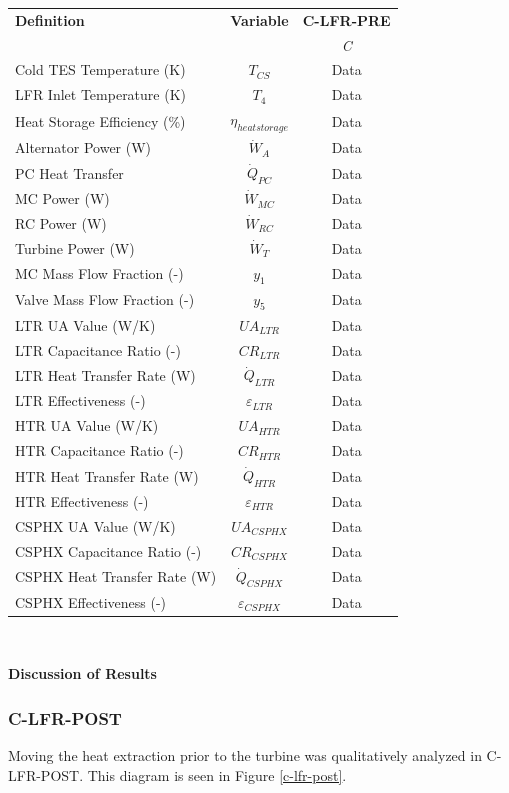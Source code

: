 \begin{paracol}{2}
\begin{specialtable}[H]
    \caption{Calculated system parameters for salt charging C-LFR-PRE cycle configuration with TES cold storage set to 663.2 K.\label{tab-c-lfr-pre}}
    \begin{tabular}{lcc}
    \toprule
    \textbf{Definition} & \textbf{Variable} & \textbf{C-LFR-PRE}\\
    & & \textit{C}\\
    \midrule	
    Cold TES Temperature (K)	&	$T_{CS}$	&	Data	\\
    LFR Inlet Temperature (K)	&	$T_{4}$	&	Data	\\
    Heat Storage Efficiency (\%)	&	$\eta_{heatstorage}$	&	Data	\\
    Alternator Power (W)	&	$\dot{W}_{A}$	&	Data	\\
    PC Heat Transfer	&	$\dot{Q}_{PC}$	&	Data	\\
    MC Power (W)	&	$\dot{W}_{MC}$	&	Data	\\
    RC Power (W)	&	$\dot{W}_{RC}$	&	Data	\\
    Turbine Power (W)	&	$\dot{W}_{T}$	&	Data	\\
    MC Mass Flow Fraction (-)	&	$y_{1}$	&	Data	\\
    Valve Mass Flow Fraction (-)	&	$y_{5}$	&	Data	\\
    LTR UA Value (W/K)	&	$UA_{LTR}$	&	Data	\\
    LTR Capacitance Ratio (-)	&	$CR_{LTR}$	&	Data	\\
    LTR Heat Transfer Rate (W)	&	$\dot{Q}_{LTR}$	&	Data	\\
    LTR Effectiveness (-)	&	$\varepsilon_{LTR}$	&	Data	\\
    HTR UA Value (W/K)	&	$UA_{HTR}$	&	Data	\\
    HTR Capacitance Ratio (-)	&	$CR_{HTR}$	&	Data	\\
    HTR Heat Transfer Rate (W)	&	$\dot{Q}_{HTR}$	&	Data	\\
    HTR Effectiveness (-)	&	$\varepsilon_{HTR}$	&	Data	\\
    CSPHX UA Value (W/K)	&	$UA_{CSPHX}$	&	Data	\\
    CSPHX Capacitance Ratio (-)	&	$CR_{CSPHX}$	&	Data	\\
    CSPHX Heat Transfer Rate (W)	&	$\dot{Q}_{CSPHX}$	&	Data	\\
    CSPHX Effectiveness (-)	&	$\varepsilon_{CSPHX}$	&	Data	\\
    \bottomrule
    \end{tabular}\\
\end{specialtable}

\textbf{Discussion of Results}

\subsubsection{C-LFR-POST} %

Moving the heat extraction prior to the turbine was qualitatively analyzed in C-LFR-POST. This diagram is seen in Figure \ref{c-lfr-post}.

\end{paracol}
